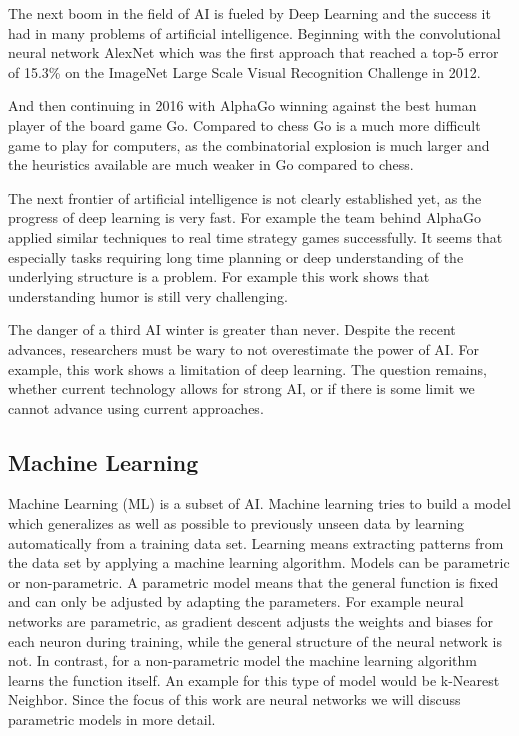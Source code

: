 \documentclass[draft,final,oneside]{vutinfth} %
\begin{document}
The next boom in the field of AI is fueled by Deep Learning and the success it had in many problems of artificial intelligence. Beginning with the convolutional neural network AlexNet which was the first approach that reached a top-5 error of 15.3\% on the ImageNet Large Scale Visual Recognition Challenge in 2012. \cite{alexnet}

And then continuing in 2016 with AlphaGo winning against the best human player of the board game Go. Compared to chess Go is a much more difficult game to play for computers, as the combinatorial explosion is much larger and the heuristics available are much weaker in Go compared to chess.

The next frontier of artificial intelligence is not clearly established yet, as the progress of deep learning is very fast. For example the team behind AlphaGo applied similar techniques to real time strategy games successfully. It seems that especially tasks requiring long time planning or deep understanding of the underlying structure is a problem. For example this work shows that understanding humor is still very challenging.

The danger of a third AI winter is greater than never. Despite the recent advances, researchers must be wary to not overestimate the power of AI. For example, this work shows a limitation of deep learning. The question remains, whether current technology allows for strong AI, or if there is some limit we cannot advance using current approaches.

\subsection{Machine Learning}

Machine Learning (ML) is a subset of AI. Machine learning tries to build a model which generalizes as well as possible to previously unseen data by learning automatically from a training data set. Learning means extracting patterns from the data set by applying a machine learning algorithm. Models can be parametric or non-parametric. A parametric model means that the general function is fixed and can only be adjusted by adapting the parameters. For example neural networks are parametric, as gradient descent adjusts the weights and biases for each neuron during training, while the general structure of the neural network is not. In contrast, for a non-parametric model the machine learning algorithm learns the function itself. An example for this type of model would be k-Nearest Neighbor.  Since the focus of this work are neural networks we will discuss parametric models in more detail.
\end{document}
